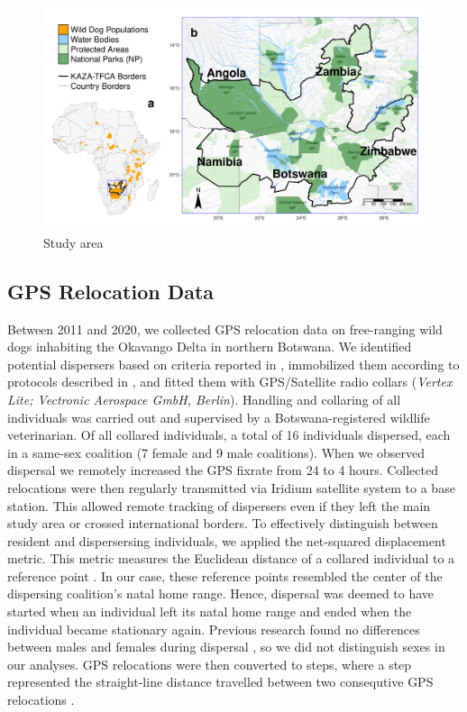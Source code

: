 \documentclass[abstract=on,10pt,a4paper,bibliography=totocnumbered]{article}
\begin{document}
\begin{figure}[htbp]
  \begin{center}
    \includegraphics[width = \textwidth]{99_StudyArea}
    \caption{Study area}
    \label{StudyArea}
  \end{center}
\end{figure}

\subsection{GPS Relocation Data}
Between 2011 and 2020, we collected GPS relocation data on free-ranging wild
dogs inhabiting the Okavango Delta in northern Botswana. We identified potential
dispersers based on criteria reported in \cite{Behr.2020}, immobilized them
according to protocols described in \cite{Osofsky.1996}, and fitted them with
GPS/Satellite radio collars (\textit{Vertex Lite; Vectronic Aerospace GmbH,
Berlin}). Handling and collaring of all individuals was carried out and
supervised by a Botswana-registered wildlife veterinarian. Of all collared
individuals, a total of 16 individuals dispersed, each in a same-sex coalition
(7 female and 9 male coalitions). When we observed dispersal we remotely
increased the GPS fixrate from 24 to 4 hours. Collected relocations were then
regularly transmitted via Iridium satellite system to a base station. This
allowed remote tracking of dispersers even if they left the main study area or
crossed international borders. To effectively distinguish between resident and
dispersersing individuals, we applied the net-squared displacement metric. This
metric measures the Euclidean distance of a collared individual to a reference
point \citep{Borger.2012}. In our case, these reference points resembled the
center of the dispersing coalition's natal home range. Hence, dispersal was
deemed to have started when an individual left its natal home range and ended
when the individual became stationary again. Previous research found no
differences between males and females during dispersal \citep{Woodroffe.2019,
Cozzi.2020}, so we did not distinguish sexes in our analyses. GPS relocations
were then converted to steps, where a step represented the straight-line
distance travelled between two consequtive GPS relocations
\citep{Turchin.1998}.
\end{document}
